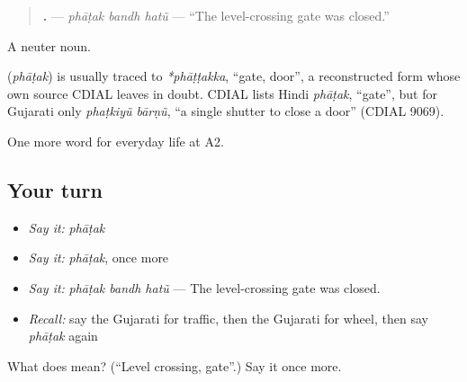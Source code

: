 \begin{quote}
\textbf{  .} — \emph{phāṭak bandh hatũ} — \textquotedblleft{}The level-crossing gate was closed.\textquotedblright{}
\end{quote}

A neuter noun.

\begin{cousinweb}
\textbf{} (\emph{phāṭak}) is usually traced to \emph{*phāṭṭakka}, \textquotedblleft{}gate, door\textquotedblright{}, a reconstructed form whose own source CDIAL leaves in doubt. CDIAL lists Hindi \emph{phāṭak}, \textquotedblleft{}gate\textquotedblright{}, but for Gujarati only \emph{phaṭkiyũ bārṇũ}, \textquotedblleft{}a single shutter to close a door\textquotedblright{} (CDIAL 9069).
\end{cousinweb}

\begin{grammarlens}[title={What you've built}]
One more word for everyday life at A2.
\end{grammarlens}

\subsection*{Your turn}
\begin{itemize}
\raggedright
  \item \emph{Say it:} \emph{phāṭak}
  \item \emph{Say it:} \emph{phāṭak}, once more
  \item \emph{Say it:} \emph{phāṭak bandh hatũ} — The level-crossing gate was closed.
  \item \emph{Recall:} say the Gujarati for traffic, then the Gujarati for wheel, then say \emph{phāṭak} again
\end{itemize}

\begin{tcolorbox}[breakable,colback=teal!4,colframe=teal!35!black,title={Before you move on}]
What does  mean? (\textquotedblleft{}Level crossing, gate\textquotedblright{}.) Say it once more.
\end{tcolorbox}
